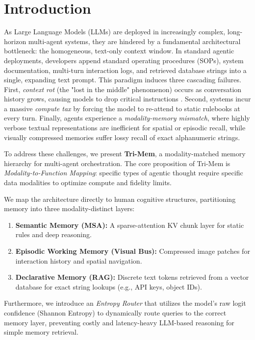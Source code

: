 \documentclass[conference]{IEEEtran}
\begin{document}
\section{Introduction}
As Large Language Models (LLMs) are deployed in increasingly complex, long-horizon multi-agent systems, they are hindered by a fundamental architectural bottleneck: the homogeneous, text-only context window. In standard agentic deployments, developers append standard operating procedures (SOPs), system documentation, multi-turn interaction logs, and retrieved database strings into a single, expanding text prompt. This paradigm induces three cascading failures. First, \textit{context rot} (the "lost in the middle" phenomenon) occurs as conversation history grows, causing models to drop critical instructions \cite{liu2023lost}. Second, systems incur a massive \textit{compute tax} by forcing the model to re-attend to static rulebooks at every turn. Finally, agents experience a \textit{modality-memory mismatch}, where highly verbose textual representations are inefficient for spatial or episodic recall, while visually compressed memories suffer lossy recall of exact alphanumeric strings.

To address these challenges, we present \textbf{Tri-Mem}, a modality-matched memory hierarchy for multi-agent orchestration. The core proposition of Tri-Mem is \textit{Modality-to-Function Mapping}: specific types of agentic thought require specific data modalities to optimize compute and fidelity limits. 

We map the architecture directly to human cognitive structures, partitioning memory into three modality-distinct layers:
\begin{enumerate}
    \item \textbf{Semantic Memory (MSA):} A sparse-attention KV chunk layer for static rules and deep reasoning.
    \item \textbf{Episodic Working Memory (Visual Bus):} Compressed image patches for interaction history and spatial navigation.
    \item \textbf{Declarative Memory (RAG):} Discrete text tokens retrieved from a vector database for exact string lookups (e.g., API keys, object IDs).
\end{enumerate}

Furthermore, we introduce an \textit{Entropy Router} that utilizes the model's raw logit confidence (Shannon Entropy) to dynamically route queries to the correct memory layer, preventing costly and latency-heavy LLM-based reasoning for simple memory retrieval.
\end{document}
